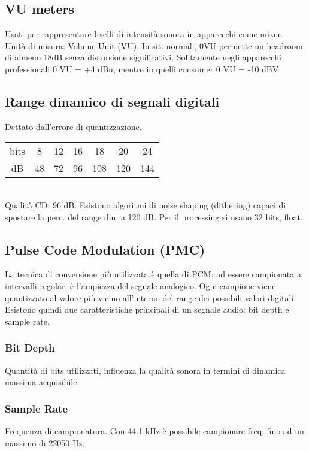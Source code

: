\documentclass[8pt,a4paper]{article}
\begin{document}
\begin{multicols}{5}
    \subsection{VU meters}
    Usati per rappresentare livelli di intensità sonora in apparecchi come mixer.
    Unità di misura: Volume Unit (VU). In sit. normali, 0VU permette un headroom
    di almeno 18dB senza distorsione significativi. Solitamente negli apparecchi
    professionali 0 VU = +4 dBu, mentre in quelli consumer 0 VU = -10 dBV

    \subsection{Range dinamico di segnali digitali}
    Dettato dall'errore di quantizzazione. 
    \begin{tabular}{ccccccc}
      bits & 8 & 12 & 16 & 18 & 20 & 24 \\
      dB & 48 & 72 & 96 & 108 & 120 & 144 
    \end{tabular} \\
    Qualità CD: 96 dB. Esistono algoritmi di noise shaping (dithering) capaci di
    spostare la perc. del range din. a 120 dB.
    Per il processing si usano 32 bits, float.

    \subsection{Pulse Code Modulation (PMC)}
    La tecnica di conversione più utilizzata è quella di PCM: ad essere campionata 
    a intervalli regolari è l’ampiezza del segnale analogico. Ogni campione viene 
    quantizzato al valore più vicino all’interno del range dei possibili valori 
    digitali. \\
    Esistono quindi due caratteristiche principali di un segnale audio: bit depth e
    sample rate.

    \subsubsection{Bit Depth}
    Quantità di bits utilizzati, influenza la qualità sonora in termini di dinamica
    massima acquisibile.

    \subsubsection{Sample Rate}
    Frequenza di campionatura. Con 44.1 kHz è possibile campionare freq. fino ad un
    massimo di 22050 Hz.


\end{multicols}
\end{document}
